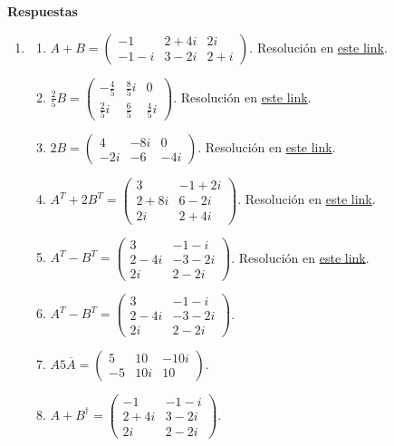 \documentclass[a4paper]{article}
\newcommand{\exercise}{\item}
\begin{document}
 \textbf{Respuestas}\begin{enumerate}\exercise\begin{enumerate} [label=(\alph*)]		\item $A+B=\left(\begin{matrix} -1 & 2+4i & 2i\\ -1-i & 3-2i & 2+i \end{matrix}\right)$. Resolución en \href{https://youtu.be/On25s6Z1DM4}{este link}.
		\item $\frac{2}{5}B=\left(\begin{matrix} -\frac{4}{5} & \frac{8}{5}i & 0\\ \frac{2}{5}i & \frac{6}{5} & \frac{4}{5}i \end{matrix}\right)$. Resolución en \href{https://youtu.be/On25s6Z1DM4}{este link}.
		\item $2B=\left(\begin{matrix} 4 & -8i & 0\\ -2i & -6 & -4i \end{matrix}\right)$. Resolución en \href{https://youtu.be/On25s6Z1DM4}{este link}.
		\item $A^T+2B^T=\left(\begin{matrix} 3 & -1+2i\\ 2+8i & 6-2i \\ 2i & 2+4i \end{matrix}\right)$. Resolución en \href{https://youtu.be/On25s6Z1DM4}{este link}.
		\item $A^T-B^T=\left(\begin{matrix} 3 & -1-i\\ 2-4i & -3-2i \\ 2i & 2-2i \end{matrix}\right)$. Resolución en \href{https://youtu.be/On25s6Z1DM4}{este link}.
		\item $A^T-B^T=\left(\begin{matrix} 3 & -1-i\\ 2-4i & -3-2i \\ 2i & 2-2i \end{matrix}\right)$.
		\item $A5\overline{A}=\left(\begin{matrix} 5 & 10 & -10i\\ -5 & 10i & 10 \end{matrix}\right)$.
		\item $A+B^{\dagger}=\left(\begin{matrix} -1 & -1-i\\ 2+4i & 3-2i \\ 2i & 2-2i \end{matrix}\right)$.

\end{enumerate}
\end{enumerate}
\end{document}
